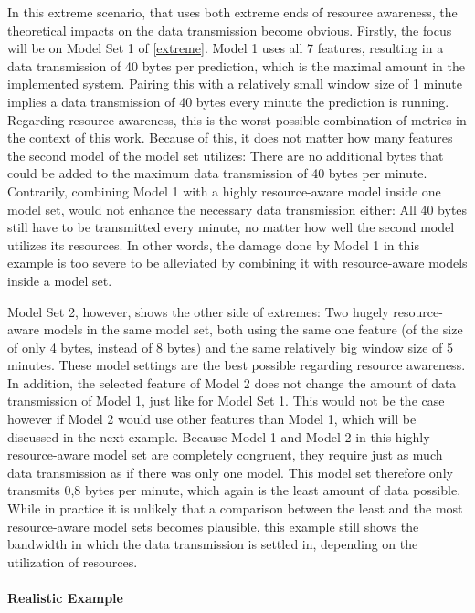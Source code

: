 In this extreme scenario, that uses both extreme ends of resource awareness, the theoretical impacts on the data transmission become obvious. Firstly, the focus will be on Model Set 1 of \autoref{extreme}. Model 1 uses all 7 features, resulting in a data transmission of 40 bytes per prediction, which is the maximal amount in the implemented system. Pairing this with a relatively small window size of 1 minute implies a data transmission of 40 bytes every minute the prediction is running. Regarding resource awareness, this is the worst possible combination of metrics in the context of this work. Because of this, it does not matter how many features the second model of the model set utilizes: There are no additional bytes that could be added to the maximum data transmission of 40 bytes per minute. Contrarily, combining Model 1 with a highly resource-aware model inside one model set, would not enhance the necessary data transmission either: All 40 bytes still have to be transmitted every minute, no matter how well the second model utilizes its resources. In other words, the damage done by Model 1 in this example is too severe to be alleviated by combining it with resource-aware models inside a model set.

Model Set 2, however, shows the other side of extremes: Two hugely resource-aware models in the same model set, both using the same one feature (of the size of only 4 bytes, instead of 8 bytes) and the same relatively big window size of 5 minutes. These model settings are the best possible regarding resource awareness. In addition, the selected feature of Model 2 does not change the amount of data transmission of Model 1, just like for Model Set 1. This would not be the case however if Model 2 would use other features than Model 1, which will be discussed in the next example. Because Model 1 and Model 2 in this highly resource-aware model set are completely congruent, they require just as much data transmission as if there was only one model. This model set therefore only transmits 0,8 bytes per minute, which again is the least amount of data possible. While in practice it is unlikely that a comparison between the least and the most resource-aware model sets becomes plausible, this example still shows the bandwidth in which the data transmission is settled in, depending on the utilization of resources.

\paragraph{Realistic Example}


